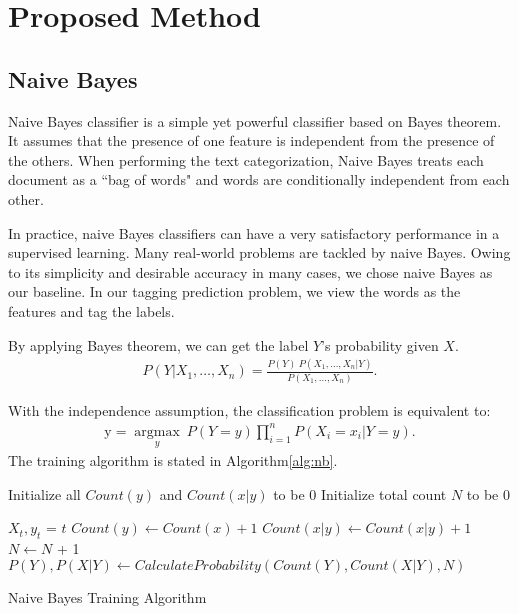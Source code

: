 \section{Proposed Method}
\subsection{Naive Bayes}
Naive Bayes classifier is a simple yet powerful classifier based on Bayes theorem. It assumes that the presence of one feature is independent from the presence of the others. When performing the text categorization, Naive Bayes treats each document as a ``bag of words" and words are conditionally independent from each other.

In practice, naive Bayes classifiers can have a very satisfactory performance in a supervised learning. Many real-world problems are tackled by naive Bayes. Owing to its simplicity and desirable accuracy in many cases, we chose naive Bayes as our baseline. In our tagging prediction problem, we view the words as the features and tag the labels.

By applying Bayes theorem, we can get the label $Y$'s probability given $X$.
\begin{gather}
    P(Y \vert X_1,\dots,X_n) = \frac{P(Y) \ P(X_1,\dots,X_n\vert Y)}{P(X_1,\dots,X_n)}. 
\end{gather}

With the independence assumption, the classification problem is equivalent to:
\begin{gather}
    \mathrm{y} = \underset{y}{\operatorname{argmax}} \ P(Y=y) \displaystyle\prod_{i=1}^n P(X_i=x_i\vert Y=y).
\end{gather}
The training algorithm is stated in Algorithm\ref{alg:nb}.

\IncMargin{1em}
\begin{algorithm}
\label{alg:nb}
\BlankLine
Initialize all $Count(y)$ and $Count(x|y)$ to be 0\;
Initialize total count $N$ to be 0\;

 {
    $X_t, y_t$ = $t$\;
     {
        $Count(y) \leftarrow Count(x) + 1$ \;
        $Count(x|y) \leftarrow Count(x|y) + 1$ \;
        $N \leftarrow N$ + 1 \;
    }
}
\Return $P(Y), P(X|Y) \leftarrow CalculateProbability(Count(Y), Count(X|Y), N)$

\caption{Naive Bayes Training Algorithm}\label{algo_disjdecomp}
\end{algorithm}
\DecMargin{1em}

